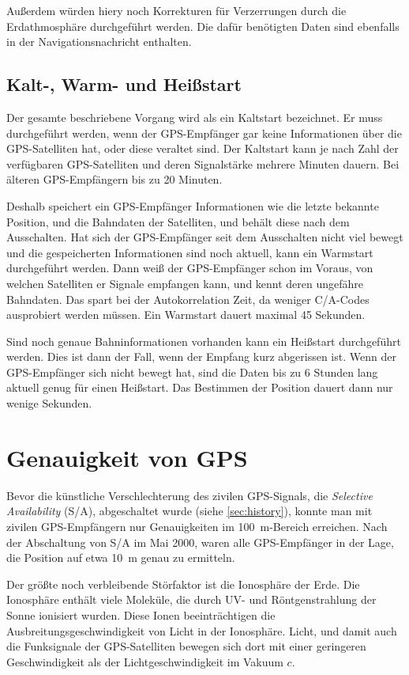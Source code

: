\documentclass[12pt,a4paper]{scrartcl}
\begin{document}
Außerdem würden hiery noch Korrekturen für Verzerrungen durch die Erdathmosphäre durchgeführt werden. Die dafür benötigten Daten sind ebenfalls in der Navigationsnachricht enthalten.

\subsection{Kalt-, Warm- und Heißstart}
Der gesamte beschriebene Vorgang wird als ein Kaltstart bezeichnet. Er muss durchgeführt werden, wenn der GPS-Empfänger gar keine Informationen über die GPS-Satelliten hat, oder diese veraltet sind. Der Kaltstart kann je nach Zahl der verfügbaren GPS-Satelliten und deren Signalstärke mehrere Minuten dauern. Bei älteren GPS-Empfängern bis zu 20 Minuten.

Deshalb speichert ein GPS-Empfänger Informationen wie die letzte bekannte Position, und die Bahndaten der Satelliten, und behält diese nach dem Ausschalten. Hat sich der GPS-Empfänger seit dem Ausschalten nicht viel bewegt und die gespeicherten Informationen sind noch aktuell, kann ein Warmstart durchgeführt werden. Dann weiß der GPS-Empfänger schon im Voraus, von welchen Satelliten er Signale empfangen kann, und kennt deren ungefähre Bahndaten. Das spart bei der Autokorrelation Zeit, da weniger C/A-Codes ausprobiert werden müssen. Ein Warmstart dauert maximal 45 Sekunden.

Sind noch genaue Bahninformationen vorhanden kann ein Heißstart durchgeführt werden. Dies ist dann der Fall, wenn der Empfang kurz abgerissen ist. Wenn der GPS-Empfänger sich nicht bewegt hat, sind die Daten bis zu 6 Stunden lang aktuell genug für einen Heißstart. Das Bestimmen der Position dauert dann nur wenige Sekunden.

\section{Genauigkeit von GPS}
\label{sec:accuracy}

Bevor die künstliche Verschlechterung des zivilen GPS-Signals, die \emph{Selective Availability} (S/A), abgeschaltet wurde (siehe \ref{sec:history}), konnte man mit zivilen GPS-Empfängern nur Genauigkeiten im \SI{100}{\meter}-Bereich erreichen. Nach der Abschaltung von S/A im Mai 2000, waren alle GPS-Empfänger in der Lage, die Position auf etwa \SI{10}{m} genau zu ermitteln.

Der größte noch verbleibende Störfaktor ist die Ionosphäre der Erde. Die Ionosphäre enthält viele Moleküle, die durch UV- und Röntgenstrahlung der Sonne ionisiert wurden. Diese Ionen beeinträchtigen die Ausbreitungsgeschwindigkeit von Licht in der Ionosphäre. Licht, und damit auch die Funksignale der GPS-Satelliten bewegen sich dort mit einer geringeren Geschwindigkeit als der Lichtgeschwindigkeit im Vakuum $c$.
\end{document}
